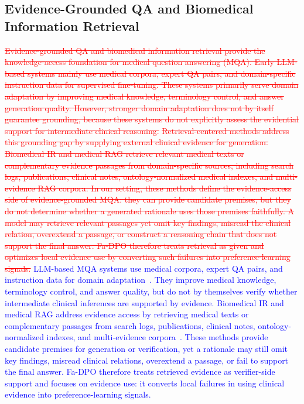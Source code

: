 \documentclass[a4paper,fleqn,doubleblind]{cas-sc}
\DeclareRobustCommand{\deleted}[1]{\textcolor{red}{\sout{#1}}}
\DeclareRobustCommand{\added}[1]{\textcolor{blue}{#1}}
\begin{document}
\subsection{Evidence-Grounded QA and Biomedical Information Retrieval}
\deleted{Evidence-grounded QA and biomedical information retrieval provide the knowledge-access foundation for medical question answering (MQA). Early LLM-based systems mainly use medical corpora, expert QA pairs, and domain-specific instruction data for supervised fine-tuning. These systems primarily serve domain adaptation by improving medical knowledge, terminology control, and answer generation quality. However, stronger domain adaptation does not by itself guarantee grounding, because these systems do not explicitly assess the evidential support for intermediate clinical reasoning.}
\deleted{Retrieval-centered methods address this grounding gap by supplying external clinical evidence for generation. Biomedical IR and medical RAG retrieve relevant medical texts or complementary evidence passages from domain-specific sources, including search logs, publications, clinical notes, ontology-normalized medical indexes, and multi-evidence RAG corpora. In our setting, these methods define the evidence-access side of evidence-grounded MQA: they can provide candidate premises, but they do not determine whether a generated rationale uses those premises faithfully. A model may retrieve relevant passages yet omit key findings, misread the clinical relation, overextend a passage, or construct a reasoning chain that does not support the final answer. Fa-DPO therefore treats retrieval as given and optimizes local evidence use by converting such failures into preference-learning signals.}
\added{LLM-based MQA systems use medical corpora, expert QA pairs, and instruction data for domain adaptation~\cite{singhal2023large, zhang2023huatuogpt, singhal2025medpalm2, labrak2024biomistral, chen2023huatuogpt2}.}
\added{They improve medical knowledge, terminology control, and answer quality, but do not by themselves verify whether intermediate clinical inferences are supported by evidence.}
\added{Biomedical IR and medical RAG address evidence access by retrieving medical texts or complementary passages from search logs, publications, clinical notes, ontology-normalized indexes, and multi-evidence corpora~\cite{jin2023medcpt, fan2025medeureka, deng2026medicalontologyir, li2026mmre, zakka2024almanac, xiong2024benchmarking, li2026evidencerag}.}
\added{These methods provide candidate premises for generation or verification, yet a rationale may still omit key findings, misread clinical relations, overextend a passage, or fail to support the final answer.}
\added{Fa-DPO therefore treats retrieved evidence as verifier-side support and focuses on evidence use: it converts local failures in using clinical evidence into preference-learning signals.}
\end{document}

